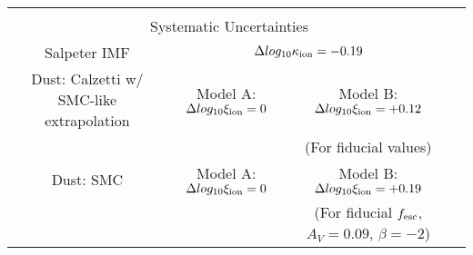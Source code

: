 \begin{table}
\begin{tabular}{cc|cccccc}
\end{tabular}
 \begin{tabular}{cc|cccccc}
	 \multicolumn{7}{c}{}\\
	 \multicolumn{7}{c}{Systematic Uncertainties}\\\hline
	 \multicolumn{2}{c}{Salpeter IMF} & \multicolumn{5}{c}{$\Delta log_{10}\kappa_{\rm{ion}} = -0.19$}\\
	 \multicolumn{2}{c}{Dust: Calzetti w/ SMC-like extrapolation} &  \multicolumn{2}{c}{Model A: $\Delta log_{10}\xi_{\rm{ion}} = 0$} & \multicolumn{3}{c}{Model B: $\Delta log_{10}\xi_{\rm{ion}} = +0.12$}\\
	 \multicolumn{2}{c}{} &  \multicolumn{2}{c}{} & \multicolumn{3}{c}{ (For fiducial values)}\\
 
	 	 \multicolumn{2}{c}{Dust: SMC \citep{Pei:1992ey}} &  \multicolumn{2}{c}{Model A: $\Delta log_{10}\xi_{\rm{ion}} = 0$} & \multicolumn{3}{c}{Model B: $\Delta log_{10}\xi_{\rm{ion}} = +0.19$} \\
	 	 \multicolumn{2}{c}{} &  \multicolumn{2}{c}{} & \multicolumn{3}{c}{(For fiducial $f_{\rm{esc}}$, $A_{V} = 0.09$, $\beta = -2$)} \\


  \end{tabular}
  \label{tab:finkelstein_N}
\end{table}
